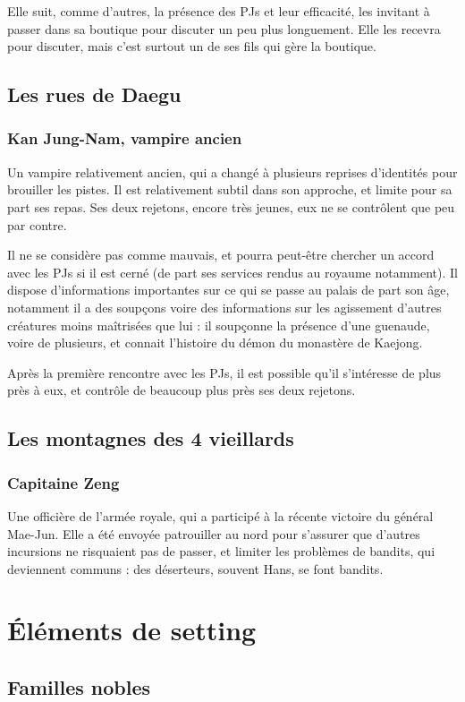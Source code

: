 \documentclass[10pt,a4paper]{book}
\begin{document}
Elle suit, comme d'autres, la présence des PJs et leur efficacité, les invitant à passer dans sa boutique pour discuter un peu plus longuement. Elle les recevra pour discuter, mais c'est surtout un de ses fils qui gère la boutique.
\section{Les rues de Daegu}
\subsection{Kan Jung-Nam, vampire ancien}
Un vampire relativement ancien, qui a changé à plusieurs reprises d'identités pour brouiller les pistes. Il est relativement subtil dans son approche, et limite pour sa part ses repas. Ses deux rejetons, encore très jeunes, eux ne se contrôlent que peu par contre.

Il ne se considère pas comme mauvais, et pourra peut-être chercher un accord avec les PJs si il est cerné (de part ses services rendus au royaume notamment). Il dispose d'informations importantes sur ce qui se passe au palais de part son âge, notamment il a des soupçons voire des informations sur les agissement d'autres créatures moins maîtrisées que lui : il soupçonne la présence d'une guenaude, voire de plusieurs, et connait l'histoire du démon du monastère de Kaejong.


Après la première rencontre avec les PJs, il est possible qu'il s'intéresse de plus près à eux, et contrôle de beaucoup plus près ses deux rejetons. 
\section{Les montagnes des 4 vieillards}
\subsection{Capitaine Zeng}
Une officière de l'armée royale, qui a participé à la récente victoire du général Mae-Jun. Elle a été envoyée patrouiller au nord pour s'assurer que d'autres incursions ne risquaient pas de passer, et limiter les problèmes de bandits, qui deviennent communs : des déserteurs, souvent Hans, se font bandits.
\chapter{Éléments de setting}
\section{Familles nobles}
\end{document}
